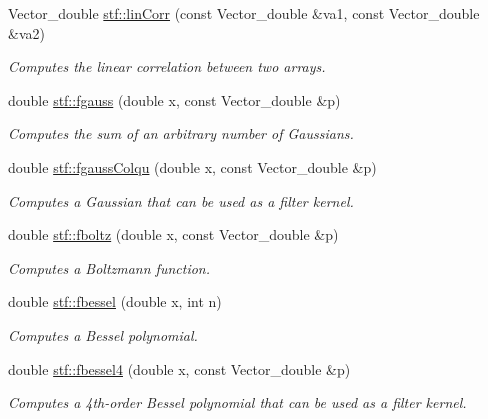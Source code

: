\begin{DoxyCompactItemize}
Vector\_\-double \hyperlink{group__stfgen_gaa0386bf9c9ceb5499900af490e06e2ab}{stf::linCorr} (const Vector\_\-double \&va1, const Vector\_\-double \&va2)
\begin{DoxyCompactList}\small\item\em Computes the linear correlation between two arrays. \item\end{DoxyCompactList}\item 
double \hyperlink{group__stfgen_gaa947b273fe10b4e93fdcba6865815a07}{stf::fgauss} (double x, const Vector\_\-double \&p)
\begin{DoxyCompactList}\small\item\em Computes the sum of an arbitrary number of Gaussians. \item\end{DoxyCompactList}\item 
double \hyperlink{group__stfgen_gaf3e890196c425798f9d97ef3b4846837}{stf::fgaussColqu} (double x, const Vector\_\-double \&p)
\begin{DoxyCompactList}\small\item\em Computes a Gaussian that can be used as a filter kernel. \item\end{DoxyCompactList}\item 
double \hyperlink{group__stfgen_ga1f97545508d6e155d20c896e5ce21f4d}{stf::fboltz} (double x, const Vector\_\-double \&p)
\begin{DoxyCompactList}\small\item\em Computes a Boltzmann function. \item\end{DoxyCompactList}\item 
double \hyperlink{group__stfgen_gacb01a426bb2ab315da605e22cf1b176d}{stf::fbessel} (double x, int n)
\begin{DoxyCompactList}\small\item\em Computes a Bessel polynomial. \item\end{DoxyCompactList}\item 
double \hyperlink{group__stfgen_gae0c21c43d67f957c3224d454319a7c00}{stf::fbessel4} (double x, const Vector\_\-double \&p)
\begin{DoxyCompactList}\small\item\em Computes a 4th-\/order Bessel polynomial that can be used as a filter kernel. \item\end{DoxyCompactList}\item 

\end{DoxyCompactItemize}
